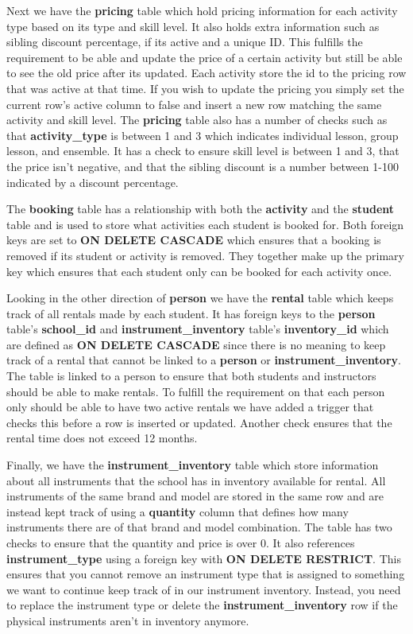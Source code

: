 \documentclass[a4paper]{scrartcl}
\begin{document}
Next we have the \textbf{pricing} table which hold pricing information for each activity type based on its type and skill level. It also holds extra information such as sibling discount percentage, if its active and a unique ID. This fulfills the requirement to be able and update the price of a certain activity but still be able to see the old price after its updated. Each activity store the id to the pricing row that was active at that time. If you wish to update the pricing you simply set the current row's active column to false and insert a new row matching the same activity and skill level. The \textbf{pricing} table also has a number of checks such as that \textbf{activity\_type} is between 1 and 3 which indicates individual lesson, group lesson, and ensemble. It has a check to ensure skill level is between 1 and 3, that the price isn't negative, and that the sibling discount is a number between 1-100 indicated by a discount percentage.

The \textbf{booking} table has a relationship with both the \textbf{activity} and the \textbf{student} table and is used to store what activities each student is booked for. Both foreign keys are set to \textbf{ON DELETE CASCADE} which ensures that a booking is removed if its student or activity is removed. They together make up the primary key which ensures that each student only can be booked for each activity once.

Looking in the other direction of \textbf{person} we have the \textbf{rental} table which keeps track of all rentals made by each student. It has foreign keys to the \textbf{person} table's \textbf{school\_id} and \textbf{instrument\_inventory} table's \textbf{inventory\_id} which are defined as \textbf{ON DELETE CASCADE} since there is no meaning to keep track of a rental that cannot be linked to a \textbf{person} or \textbf{instrument\_inventory}. The table is linked to a person to ensure that both students and instructors should be able to make rentals. To fulfill the requirement on that each person only should be able to have two active rentals we have added a trigger that checks this before a row is inserted or updated. Another check ensures that the rental time does not exceed 12 months.

Finally, we have the \textbf{instrument\_inventory} table which store information about all instruments that the school has in inventory available for rental. All instruments of the same brand and model are stored in the same row and are instead kept track of using a \textbf{quantity} column that defines how many instruments there are of that brand and model combination. The table has two checks to ensure that the quantity and price is over 0. It also references \textbf{instrument\_type} using a foreign key with \textbf{ON DELETE RESTRICT}. This ensures that you cannot remove an instrument type that is assigned to something we want to continue keep track of in our instrument inventory. Instead, you need to replace the instrument type or delete the \textbf{instrument\_inventory} row if the physical instruments aren't in inventory anymore.
\end{document}
